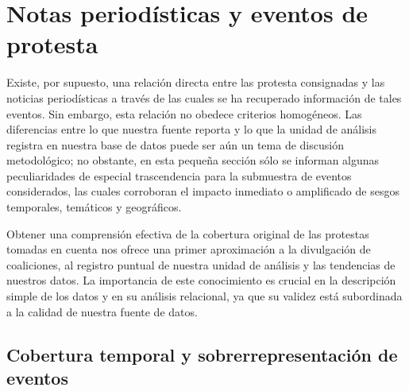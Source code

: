 \documentclass[letterpaper, 11pt]{book}
\theoremstyle{definition}
\theoremstyle{remark}
\begin{document}
\section{Notas periodísticas y eventos de protesta}
\label{sec:Fuente_EPs}

Existe, por supuesto, una relación directa entre las protesta consignadas y las noticias periodísticas a través de las cuales se ha recuperado información de tales eventos. 
Sin embargo, esta relación no obedece criterios homogéneos. 
Las diferencias entre lo que nuestra fuente reporta y lo que la unidad de análisis registra en nuestra base de datos puede ser aún un tema de discusión metodológico; no obstante, en esta pequeña sección sólo se informan algunas peculiaridades de especial trascendencia para la submuestra de eventos considerados, las cuales corroboran el impacto inmediato o amplificado de sesgos temporales, temáticos y geográficos. 


Obtener una comprensión efectiva de la cobertura original de las protestas tomadas en cuenta nos ofrece una primer aproximación a la divulgación de coaliciones, al registro puntual de nuestra unidad de análisis y las tendencias de nuestros datos. 
La importancia de este conocimiento es crucial en la descripción simple de los datos y en su análisis relacional, ya que su validez está subordinada a la calidad de nuestra fuente de datos. 


\subsection{Cobertura temporal y sobrerrepresentación de eventos}
\label{sec:cobertura}
\end{document}
